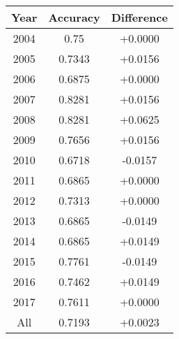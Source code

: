 \vspace{0.5cm}
\begin{tabular}{c c c}
    \toprule
    Year & Accuracy & Difference\\
    \midrule
    2004 & 0.75 & +0.0000\\
    2005 & 0.7343 & +0.0156\\
    2006 & 0.6875 & +0.0000\\
    2007 & 0.8281 & +0.0156\\
    2008 & 0.8281 & +0.0625\\
    2009 & 0.7656 & +0.0156\\
    2010 & 0.6718 & -0.0157\\
    2011 & 0.6865 & +0.0000\\
    2012 & 0.7313 & +0.0000\\
    2013 & 0.6865 & -0.0149\\
    2014 & 0.6865 & +0.0149\\
    2015 & 0.7761 & -0.0149\\
    2016 & 0.7462 & +0.0149\\
    2017 & 0.7611 & +0.0000\\
    All & 0.7193 & +0.0023\\
    \bottomrule
  \end{tabular}
  \vspace{0.5cm}